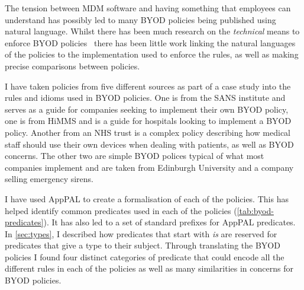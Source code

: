 \documentclass[a4paper]{scrartcl}
\begin{document}
The tension between \ac{MDM} software and having something that employees can
understand has possibly led to many BYOD policies being published using natural
language. Whilst there has been much research on the \emph{technical} means to
enforce BYOD
policies~\cite{martinelli_enhancing_2016,armando_enabling_2014,costantino_towards_2013}
there has been little work linking the natural languages of the policies to the
implementation used to enforce the rules, as well as making precise comparisons
between policies.

I have taken policies from five different sources as part of a case study into
the rules and idioms used in BYOD policies.  One is from the SANS
institute and serves as a guide for companies seeking to implement their own
BYOD policy, one is from HiMMS and is a guide for hospitals looking to implement
a BYOD policy.  Another from an NHS trust is a complex policy describing
how medical staff should use their own devices when dealing with patients, as
well as BYOD concerns.  The other two are simple BYOD polices typical of what
most companies implement and are taken from Edinburgh University and a company
selling emergency sirens.

I have used AppPAL to create a formalisation of each of the policies. This has
helped identify common predicates used in each of the policies
(\autoref{tab:byod-predicates}). It has also led to a set of
standard prefixes for AppPAL predicates. In \autoref{sec:types}, I described how
predicates that start with \emph{is} are reserved for predicates that give a
type to their subject. Through translating the BYOD policies I found four
distinct categories of predicate that could encode all the different rules in
each of the policies as well as many similarities in concerns for BYOD
policies.
\end{document}
